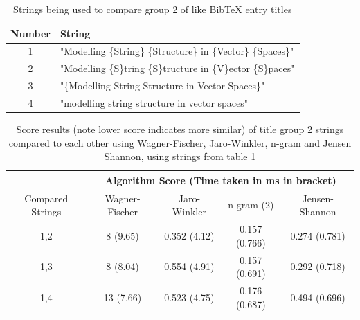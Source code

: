 \documentclass[a4paper,11pt]{article}
\begin{document}
\begin{table}[H]
      \centering
      \begin{tabular}{|c|p{}|}
      \hline
           Number &  String \\ \hline \hline
           1 & "Modelling \{String\} \{Structure\} in \{Vector\} \{Spaces\}" \\ \hline
           2 & "Modelling \{S\}tring \{S\}tructure in \{V\}ector \{S\}paces" \\ \hline
           3 & "\{Modelling String Structure in Vector Spaces\}" \\ \hline
           4 & "modelling string structure in vector spaces" \\ \hline
      \end{tabular}
  \caption{Strings being used to compare group 2 of like BibTeX entry titles}
\label{table:titleGroup2Strings}
\end{table}
    \begin{table}[H]
    \centering
       \begin{tabular}{|c|c|c|c|c|}
    \hline
     & \multicolumn{4}{c|}{Algorithm Score (Time taken in ms in bracket)}\\
     \hline
     Compared Strings  & Wagner-Fischer & Jaro-Winkler & n-gram (2) & Jensen-Shannon \\
     \hline \hline
    1,2 & 8	(9.65) &
0.352 (4.12) &
0.157 (0.766) &
0.274 (0.781) \\
             \hline
    1,3 & 8 (8.04) &
0.554 (4.91) &
0.157 (0.691) &
0.292 (0.718) \\
    \hline
    1,4 & 13 (7.66) &
0.523 (4.75) &
0.176 (0.687) &
0.494 (0.696) \\
    \hline
    \end{tabular}
    \caption{Score results (note lower score indicates more similar) of title group 2 strings compared to each other using Wagner-Fischer, Jaro-Winkler, n-gram and Jensen Shannon, using strings from table \ref{table:titleGroup2Strings}}
\label{table:algComparisonResultsTitle2}
\end{table}
\end{document}
